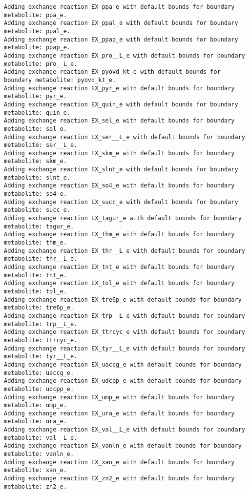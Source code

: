 \documentclass[
  letterpaper,
  DIV=11,
  numbers=noendperiod]{scrartcl}
\begin{document}
\begin{verbatim}
Adding exchange reaction EX_ppa_e with default bounds for boundary metabolite: ppa_e.
Adding exchange reaction EX_ppal_e with default bounds for boundary metabolite: ppal_e.
Adding exchange reaction EX_ppap_e with default bounds for boundary metabolite: ppap_e.
Adding exchange reaction EX_pro__L_e with default bounds for boundary metabolite: pro__L_e.
Adding exchange reaction EX_pyovd_kt_e with default bounds for boundary metabolite: pyovd_kt_e.
Adding exchange reaction EX_pyr_e with default bounds for boundary metabolite: pyr_e.
Adding exchange reaction EX_quin_e with default bounds for boundary metabolite: quin_e.
Adding exchange reaction EX_sel_e with default bounds for boundary metabolite: sel_e.
Adding exchange reaction EX_ser__L_e with default bounds for boundary metabolite: ser__L_e.
Adding exchange reaction EX_skm_e with default bounds for boundary metabolite: skm_e.
Adding exchange reaction EX_slnt_e with default bounds for boundary metabolite: slnt_e.
Adding exchange reaction EX_so4_e with default bounds for boundary metabolite: so4_e.
Adding exchange reaction EX_succ_e with default bounds for boundary metabolite: succ_e.
Adding exchange reaction EX_tagur_e with default bounds for boundary metabolite: tagur_e.
Adding exchange reaction EX_thm_e with default bounds for boundary metabolite: thm_e.
Adding exchange reaction EX_thr__L_e with default bounds for boundary metabolite: thr__L_e.
Adding exchange reaction EX_tnt_e with default bounds for boundary metabolite: tnt_e.
Adding exchange reaction EX_tol_e with default bounds for boundary metabolite: tol_e.
Adding exchange reaction EX_tre6p_e with default bounds for boundary metabolite: tre6p_e.
Adding exchange reaction EX_trp__L_e with default bounds for boundary metabolite: trp__L_e.
Adding exchange reaction EX_ttrcyc_e with default bounds for boundary metabolite: ttrcyc_e.
Adding exchange reaction EX_tyr__L_e with default bounds for boundary metabolite: tyr__L_e.
Adding exchange reaction EX_uaccg_e with default bounds for boundary metabolite: uaccg_e.
Adding exchange reaction EX_udcpp_e with default bounds for boundary metabolite: udcpp_e.
Adding exchange reaction EX_ump_e with default bounds for boundary metabolite: ump_e.
Adding exchange reaction EX_ura_e with default bounds for boundary metabolite: ura_e.
Adding exchange reaction EX_val__L_e with default bounds for boundary metabolite: val__L_e.
Adding exchange reaction EX_vanln_e with default bounds for boundary metabolite: vanln_e.
Adding exchange reaction EX_xan_e with default bounds for boundary metabolite: xan_e.
Adding exchange reaction EX_zn2_e with default bounds for boundary metabolite: zn2_e.

\end{verbatim}
\end{document}
